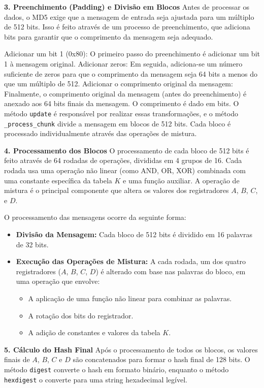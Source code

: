 \documentclass{article}
\begin{document}
\textbf{3. Preenchimento (Padding) e Divisão em Blocos} 
Antes de processar os dados, o MD5 exige que a mensagem de entrada seja ajustada para um múltiplo de 512 bits. Isso é feito através de um processo de preenchimento, que adiciona bits para garantir que o comprimento da mensagem seja adequado.

Adicionar um bit 1 (0x80): O primeiro passo do preenchimento é adicionar um bit 1 à mensagem original. 
Adicionar zeros: Em seguida, adiciona-se um número suficiente de zeros para que o comprimento da mensagem seja 64 bits a menos do que um múltiplo de 512.
Adicionar o comprimento original da mensagem: Finalmente, o comprimento original da mensagem (antes do preenchimento) é anexado aos 64 bits finais da mensagem. O comprimento é dado em bits. 
O método \texttt{update} é responsável por realizar essas transformações, e o método \texttt{\_process\_chunk} divide a mensagem em blocos de 512 bits. Cada bloco é processado individualmente através das operações de mistura.

\textbf{4. Processamento dos Blocos} 
O processamento de cada bloco de 512 bits é feito através de 64 rodadas de operações, divididas em 4 grupos de 16. Cada rodada usa uma operação não linear (como AND, OR, XOR) combinada com uma constante específica da tabela $K$ e uma função auxiliar. A operação de mistura é o principal componente que altera os valores dos registradores $A$, $B$, $C$, e $D$.

O processamento das mensagens ocorre da seguinte forma:

\begin{itemize}
    \item \textbf{Divisão da Mensagem:} Cada bloco de 512 bits é dividido em 16 palavras de 32 bits.
    \item \textbf{Execução das Operações de Mistura:} A cada rodada, um dos quatro registradores ($A$, $B$, $C$, $D$) é alterado com base nas palavras do bloco, em uma operação que envolve:
    \begin{itemize}
        \item A aplicação de uma função não linear para combinar as palavras.
        \item A rotação dos bits do registrador.
        \item A adição de constantes e valores da tabela $K$.
    \end{itemize}
\end{itemize}

\textbf{5. Cálculo do Hash Final} 
Após o processamento de todos os blocos, os valores finais de $A$, $B$, $C$ e $D$ são concatenados para formar o hash final de 128 bits. O método \texttt{digest} converte o hash em formato binário, enquanto o método \texttt{hexdigest} o converte para uma string hexadecimal legível.
\end{document}
